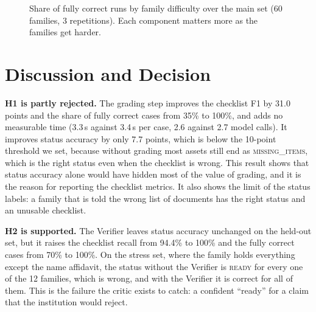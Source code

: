 \documentclass[12pt,a4paper,oneside]{report}
\begin{document}
\begin{figure}[t]
\centering
{}
\caption[Fully correct runs by difficulty]{Share of fully correct runs by family difficulty over the main set (60 families, 3 repetitions). Each component matters more as the families get harder.}
\label{fig:diff}
\end{figure}

\section{Discussion and Decision}
\textbf{H1 is partly rejected.} The grading step improves the checklist F1 by 31.0 points and the share of fully correct cases from 35\% to 100\%, and adds no measurable time (3.3\,s against 3.4\,s per case, 2.6 against 2.7 model calls). It improves status accuracy by only 7.7 points, which is below the 10-point threshold we set, because without grading most assets still end as \textsc{missing\_items}, which is the right status even when the checklist is wrong. This result shows that status accuracy alone would have hidden most of the value of grading, and it is the reason for reporting the checklist metrics. It also shows the limit of the status labels: a family that is told the wrong list of documents has the right status and an unusable checklist.

\textbf{H2 is supported.} The Verifier leaves status accuracy unchanged on the held-out set, but it raises the checklist recall from 94.4\% to 100\% and the fully correct cases from 70\% to 100\%. On the stress set, where the family holds everything except the name affidavit, the status without the Verifier is \textsc{ready} for every one of the 12 families, which is wrong, and with the Verifier it is correct for all of them. This is the failure the critic exists to catch: a confident ``ready'' for a claim that the institution would reject.
\end{document}
